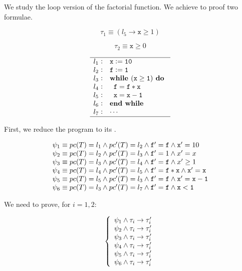 


We study the loop version of the factorial function. We achieve to proof two formulae.

\[\tau_1 \equiv (l_5 \to \mathtt{x}\geq 1)\]

\[\tau_2 \equiv \mathtt{x} \geq 0\]



\[
	\begin{array}{l@{\hspace{0.3em}}c@{\hspace{1em}}l}
	\hline
		l_1 & : & \mathtt{x := 10} \\
		l_2 & : & \mathtt{f := 1} \\
		l_3 & : & \mathtt{\textbf{while } (x\geq 1) \textbf{ do }} \\
		l_4 & : & \mathtt{\;\;f = f*x} \\
		l_5 & : & \mathtt{\;\;x=x-1} \\ 	
		l_6 & : & \mathtt{\textbf{end while}}\\
		l_7 & : & \mathtt{\cdots}\\
	\hline
	\end{array}
\]
\label{simple:example}


First, we reduce the program to its \VC.


\[
	\begin{array}{l}
		 \psi_1 \equiv pc(T) = l_1 \wedge pc'(T) = l_2 \wedge \mathtt{f'=f} \wedge \mathtt{x}' = 10\\
		 \psi_2 \equiv pc(T) = l_2 \wedge pc'(T) = l_3 \wedge \mathtt{f}' = 1 \wedge x'=x\\
		 \psi_3 \equiv pc(T) = l_3 \wedge pc'(T) = l_4 \wedge \mathtt{f'=f} \wedge x'\geq 1\\
		 \psi_4 \equiv pc(T) = l_4 \wedge pc'(T) = l_5 \wedge \mathtt{f}' = \mathtt{f*x} \wedge \mathtt{x'=x}\\
		 \psi_5 \equiv pc(T) = l_5 \wedge pc'(T) = l_3 \wedge \mathtt{f'=f} \wedge \mathtt{x'=x-1}\\
		 \psi_6 \equiv pc(T) = l_3 \wedge pc'(T) = l_7 \wedge \mathtt{f'=f} \wedge \mathtt{x<1}
	\end{array}
\]

We need to prove, for $i=1,2$:

\[
	\left\{
		\begin{array}{l}
			\psi_1 \wedge \tau_i \to \tau_i'\\
			\psi_2 \wedge \tau_i \to \tau_i'\\
			\psi_3 \wedge \tau_i \to \tau_i'\\
			\psi_4 \wedge \tau_i \to \tau_i'\\
			\psi_5 \wedge \tau_i \to \tau_i'\\
			\psi_6 \wedge \tau_i \to \tau_i'\\
		\end{array}
	\right.
\]

